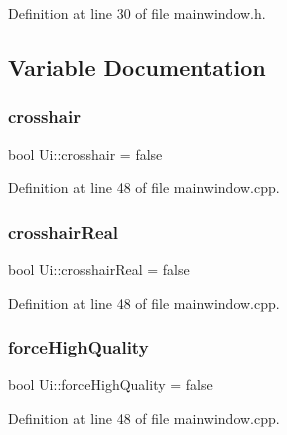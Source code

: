 Definition at line 30 of file mainwindow.\+h.



\subsection{Variable Documentation}
\mbox{\label{namespace_ui_abe5a6cd1ec23118ea54cb4a9d8d0bde3}} 
\subsubsection{\texorpdfstring{crosshair}{crosshair}}
{\footnotesize\ttfamily bool Ui\+::crosshair = false}



Definition at line 48 of file mainwindow.\+cpp.

\mbox{\label{namespace_ui_ab5be07ff0bbd6f053a2eeeb3148e4531}} 
\subsubsection{\texorpdfstring{crosshairReal}{crosshairReal}}
{\footnotesize\ttfamily bool Ui\+::crosshair\+Real = false}



Definition at line 48 of file mainwindow.\+cpp.

\mbox{\label{namespace_ui_a9665fd20baaf4665d58dedf7ec1bca54}} 
\subsubsection{\texorpdfstring{forceHighQuality}{forceHighQuality}}
{\footnotesize\ttfamily bool Ui\+::force\+High\+Quality = false}



Definition at line 48 of file mainwindow.\+cpp.

